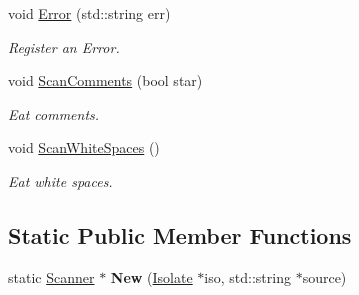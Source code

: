 \begin{DoxyCompactItemize}
void \hyperlink{class_cobra_1_1internal_1_1_scanner_a9045c5fb2d33b152504dd5026bca5fa8}{Error} (std\+::string err)
\begin{DoxyCompactList}\small\item\em Register an Error. \end{DoxyCompactList}\item 
void \hyperlink{class_cobra_1_1internal_1_1_scanner_aba8d0ba29f8e9609f2f61c6466fb0e5d}{Scan\+Comments} (bool star)
\begin{DoxyCompactList}\small\item\em Eat comments. \end{DoxyCompactList}\item 
\hypertarget{class_cobra_1_1internal_1_1_scanner_ac05a201981599e01a69a1f411b555cb3}{void \hyperlink{class_cobra_1_1internal_1_1_scanner_ac05a201981599e01a69a1f411b555cb3}{Scan\+White\+Spaces} ()}\label{class_cobra_1_1internal_1_1_scanner_ac05a201981599e01a69a1f411b555cb3}

\begin{DoxyCompactList}\small\item\em Eat white spaces. \end{DoxyCompactList}\end{DoxyCompactItemize}
\subsection*{Static Public Member Functions}
\begin{DoxyCompactItemize}
\item 
\hypertarget{class_cobra_1_1internal_1_1_scanner_ad9f8da9f077c4b710d09ce906e3f2d0a}{static \hyperlink{class_cobra_1_1internal_1_1_scanner}{Scanner} $\ast$ {\bfseries New} (\hyperlink{class_cobra_1_1internal_1_1_isolate}{Isolate} $\ast$iso, std\+::string $\ast$source)}\label{class_cobra_1_1internal_1_1_scanner_ad9f8da9f077c4b710d09ce906e3f2d0a}

\end{DoxyCompactItemize}
